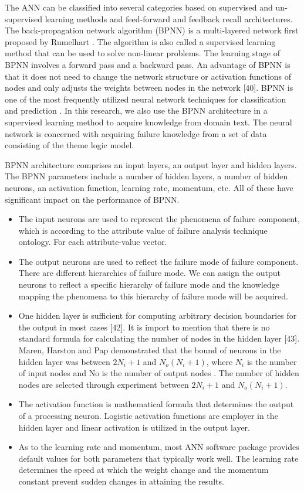 \documentclass{elsarticle}
\begin{document}
The ANN can be classified into several categories based on supervised
and un-supervised learning methods and feed-forward and feedback
recall architectures. The back-propagation network algorithm (BPNN) is
a multi-layered network first proposed by Rumelhart
\cite{rumelhart1986lir}. The algorithm is also called a supervised
learning method that can be used to solve non-linear problems. The
learning stage of BPNN involves a forward pass and a backward pass. An
advantage of BPNN is that it does not need to change the network
structure or activation functions of nodes and only adjusts the
weights between nodes in the network [40]. BPNN is one of the most
frequently utilized neural network techniques for classification and
prediction \cite{graupe2007pan}. In this research, we also use the
BPNN architecture in a supervised learning method to acquire knowledge
from domain text. The neural network is concerned with acquiring
failure knowledge from a set of data consisting of the theme logic
model. 

BPNN architecture comprises an input layers, an output layer and hidden layers. The BPNN parameters include a number of hidden layers, a number of hidden neurons, an activation function, learning rate, momentum, etc. All of these have significant impact on the performance of BPNN.
\begin{itemize}
\item The input neurons are used to represent the phenomena of failure component, which is according to the attribute value of failure analysis technique ontology. For each attribute-value vector.
\item The output neurons are used to reflect the failure mode of failure component. There are different hierarchies of failure mode. We can assign the output neurons to reflect a specific hierarchy of failure mode and the knowledge mapping the phenomena to this hierarchy of failure mode will be acquired. 
\item One hidden layer is sufficient for computing arbitrary decision
  boundaries for the output in most cases [42]. It is import to
  mention that there is no standard formula for calculating the number
  of nodes in the hidden layer [43]\cite{turban:oaj}. Maren, Harston
  and Pap demonstrated that the bound of neurons in the hidden layer
  was between $2N_i+1$ and $N_o(N_i +1)$, where $N_i$ is the number of
  input nodes and No is the number of output nodes
  \cite{maren1990hnc}. The number of hidden nodes are selected through
  experiment between $2N_i+1$ and $N_o(N_i +1)$. 
\item The activation function is mathematical formula that determines the output of a processing neuron. Logistic activation functions are employer in the hidden layer and linear activation is utilized in the output layer.  
\item As to the learning rate and momentum, most ANN software package provides default values for both parameters that typically work well. The learning rate determines the speed at which the weight change and the momentum constant prevent sudden changes in attaining the results.  


\end{itemize}
\end{document}
